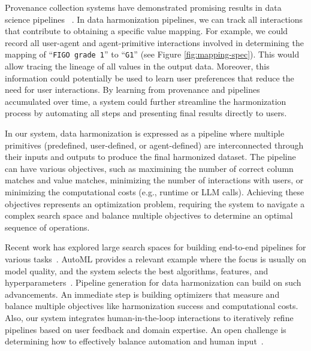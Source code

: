 Provenance collection systems have demonstrated promising results in data science pipelines ~\cite{rupprechtVLDB2020,chapmanCapturing2020}.
In data harmonization pipelines, we can track all interactions that contribute to obtaining a specific value mapping. For example, we could record all user-agent and agent-primitive interactions involved in determining the mapping of ``\texttt{FIGO grade 1}'' to ``\texttt{G1}'' (see Figure \ref{fig:mapping-spec}). 
This would allow tracing the lineage of all values in the output data. Moreover, this information could potentially be used to learn user preferences that reduce the need for user interactions.
By learning from provenance and pipelines accumulated over time, a system could further streamline the harmonization process by automating all steps and presenting final results directly to users.


In our system, data harmonization is expressed as a pipeline where multiple primitives (predefined, user-defined, or agent-defined) are interconnected through their inputs and outputs to produce the final harmonized dataset. 
The pipeline can have various objectives, such as maximining the number of correct column matches and value matches, minimizing the number of interactions with users, or minimizing the computational costs (e.g., runtime or LLM calls).
Achieving these objectives represents an optimization problem, requiring the system to navigate a complex search space and balance multiple objectives to determine an optimal sequence of operations.

Recent work has explored large search spaces for building end-to-end pipelines for various tasks~\cite{lopez2023alphad3m,substrat2022,autopipeline2012vldb,volcanoVLDB2021}. AutoML provides a relevant example where the focus is usually on model quality, and the system selects the best algorithms, features, and hyperparameters~\cite{lopez2023alphad3m}. Pipeline generation for data harmonization can build on such advancements. 
An immediate step is building optimizers that measure and balance multiple objectives like harmonization success and computational costs.
Also, our system integrates human-in-the-loop interactions to iteratively refine pipelines based on user feedback and domain expertise. 
An open challenge is determining how to effectively balance automation and human input~\cite{human-in-the-loopdataintegration2017}.

